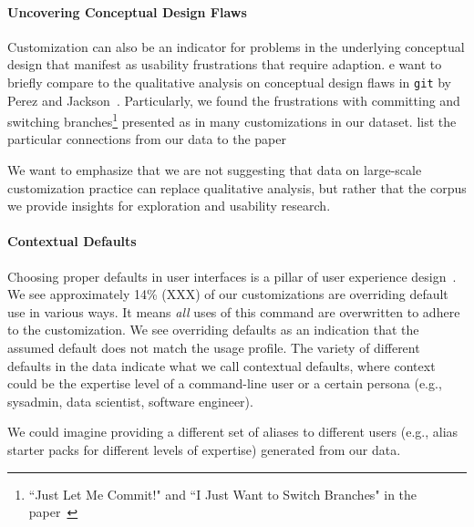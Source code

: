 \paragraph{\bf Uncovering Conceptual Design Flaws}

Customization can also be an indicator for problems in the underlying conceptual design that manifest as usability frustrations that require adaption.
e want to briefly compare to the qualitative analysis on conceptual design flaws in \verb|git| by Perez and Jackson~\cite{perez:13}.
Particularly, we found the frustrations with committing and switching branches\footnote{``Just Let Me Commit!" and ``I Just Want to Switch Branches" in the paper~\cite{perez:13}} presented as in many customizations in our dataset.
\TODO list the particular connections from our data to the paper

We want to emphasize that we are not suggesting that data on large-scale customization practice can replace qualitative analysis, but rather that the corpus we provide insights for exploration and usability research.

\paragraph{\bf Contextual Defaults}

Choosing proper defaults in user interfaces is a pillar of user experience design~\cite{nielsen2005power}.
We see approximately 14\% (XXX) of our customizations are overriding default use in various ways.
It means \emph{all} uses of this command are overwritten to adhere to the customization. 
We see overriding defaults as an indication that the assumed default does not match the usage profile.
The variety of different defaults in the data indicate what we call contextual defaults, where context could be the expertise level of a command-line user or a certain persona (e.g., sysadmin, data scientist, software engineer).

We could imagine providing a different set of aliases to different users (e.g., alias starter packs for different levels of expertise) generated from our data.




